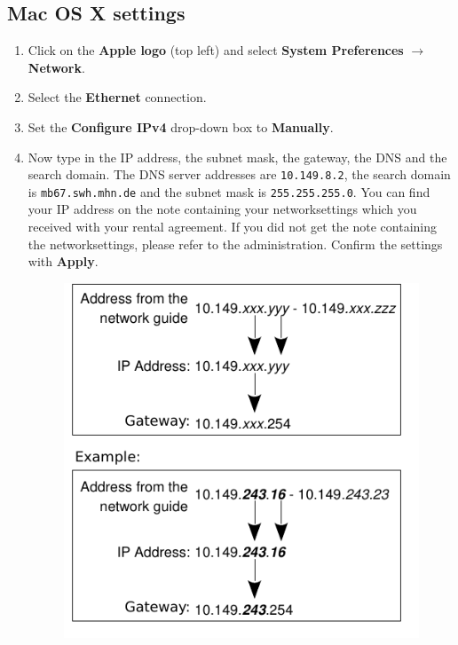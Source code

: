\documentclass[a4paper,12pt]{scrartcl}
\newcommand{\optemph}[1]{\textbf{#1}}
\begin{document}
\subsection*{Mac OS X settings}
\begin{enumerate}
	\item Click on the \optemph{Apple logo} (top left) and select \optemph{System Preferences} $\rightarrow$ \optemph{Network}.
	\item Select the \optemph{Ethernet} connection.
	\item Set the \optemph{Configure IPv4} drop-down box to \optemph{Manually}.
	\item Now type in the IP address, the subnet mask, the gateway, the DNS and the search domain. The DNS server addresses are \nolinkurl{10.149.8.2}, the search domain is \nolinkurl{mb67.swh.mhn.de} and the subnet mask is \nolinkurl{255.255.255.0}. You can find your IP address on the note containing your networksettings which you received with your rental agreement. If you did not get the note containing the networksettings, please refer to the administration. Confirm the settings with \optemph{Apply}.
      \begin{figure}[h!]
      \centering
        \begin{minipage}[c]{0.38\linewidth}
          \centering
          \includegraphics[width=\linewidth,keepaspectratio]{Bilder/IP_Gerneric_EN}

\end{minipage}
\end{figure}
\end{enumerate}
\end{document}
